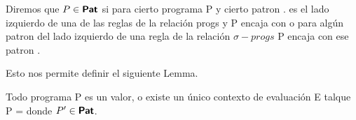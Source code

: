 \begin{definition}
    Diremos que $P \in \textsf{\textbf{Pat}}$ si para cierto programa P y cierto patron .  es el lado izquierdo de una de las reglas de la relación progs y P encaja con 
    o para algún patron  del lado izquierdo de una regla de la relación $\sigma-progs$ P encaja con ese patron .
\end{definition}

Esto nos permite definir el siguiente Lemma.

\begin{lemma}
    Todo programa P es un valor, o existe un único contexto de evaluación E talque 
    P =  donde $P' \in \textsf{\textbf{Pat}}$.
\end{lemma}

